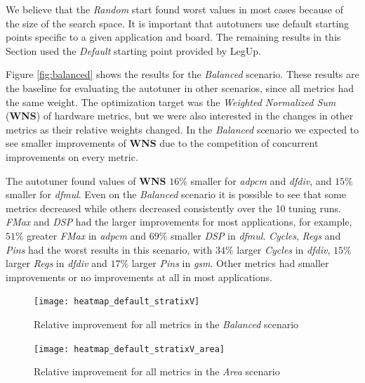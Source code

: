 We believe that the \textit{Random} start found worst values in most cases
because of the size of the search space. It is important that autotuners use
default starting points specific to a given application and board.  The
remaining results in this Section used the \textit{Default} starting point
provided by LegUp.

Figure \ref{fig:balanced} shows the results for the \textit{Balanced} scenario.
These results are the baseline for evaluating the autotuner in other scenarios,
since all metrics had the same weight.  The optimization target was the
\textit{Weighted Normalized Sum} (\textbf{WNS}) of hardware metrics, but we
were also interested in the changes in other metrics as their relative weights
changed. In the \textit{Balanced} scenario we expected to see smaller
improvements of \textbf{WNS} due to the competition of concurrent improvements
on every metric.

The autotuner found values of \textbf{WNS} $16\%$ smaller for \textit{adpcm}
and \textit{dfdiv}, and $15\%$ smaller for \textit{dfmul}.  Even on the
\textit{Balanced} scenario it is possible to see that some metrics decreased
while others decreased consistently over the 10 tuning runs. \textit{FMax} and
\textit{DSP} had the larger improvements for most applications, for example,
$51\%$ greater \textit{FMax} in \textit{adpcm} and $69\%$ smaller \textit{DSP}
in \textit{dfmul}.  \textit{Cycles}, \textit{Regs} and \textit{Pins} had the
worst results in this scenario, with $34\%$ larger \textit{Cycles} in
\textit{dfdiv}, $15\%$ larger \textit{Regs} in \textit{dfdiv} and $17\%$ larger
\textit{Pins} in \textit{gsm}.  Other metrics had smaller improvements or no
improvements at all in most applications.

\begin{figure}[htpb]
    \begin{minipage}{.48\textwidth}
        \centering
        \texttt{[image: heatmap\_default\_stratixV]}
        \caption{Relative improvement for all metrics in the \textit{Balanced}
        scenario}
        \label{fig:balanced}
    \end{minipage}%
    \hfill
    \begin{minipage}{.48\textwidth}
        \centering
        \texttt{[image: heatmap\_default\_stratixV\_area]}
        \caption{Relative improvement for all metrics in the \textit{Area}
        scenario}
        \label{fig:area}
    \end{minipage}%
\end{figure}

